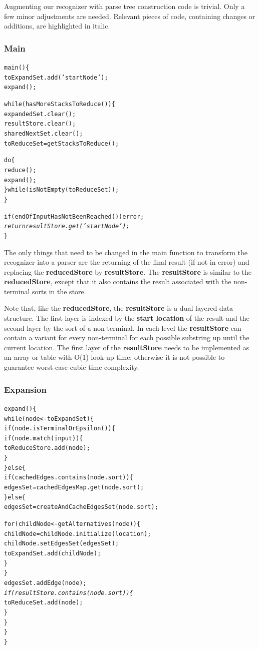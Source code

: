\documentclass[a4paper,10pt]{article}
\begin{document}
Augmenting our recognizer with parse tree construction code is trivial. Only a few minor adjustments are needed. Relevant pieces of code, containing changes or additions, are highlighted in italic.

\subsubsection{Main}
{\small
\begin{alltt}
main()\{
  toExpandSet.add('startNode');
  expand();
  
  while(hasMoreStacksToReduce())\{
    expandedSet.clear();
    resultStore.clear();
    sharedNextSet.clear();
    toReduceSet = getStacksToReduce();
    
    do\{
       reduce();
       expand();
    \}while(isNotEmpty(toReduceSet));
  \}
  
  if(endOfInputHasNotBeenReached()) error;
  \textit{
  return resultStore.get('startNode');}
\}
\end{alltt}
}

The only things that need to be changed in the main function to transform the recognizer into a parser are the returning of the final result (if not in error) and replacing the {\bf reducedStore} by {\bf resultStore}. The {\bf resultStore} is similar to the {\bf reducedStore}, except that it also contains the result associated with the non-terminal sorts in the store.

Note that, like the {\bf reducedStore}, the {\bf resultStore} is a dual layered data structure. The first layer is indexed by the {\bf start location} of the result and the second layer by the sort of a non-terminal. In each level the {\bf resultStore} can contain a variant for every non-terminal for each possible substring up until the current location. The first layer of the {\bf resultStore} needs to be implemented as an array or table with O(1) look-up time; otherwise it is not possible to guarantee worst-case cubic time complexity.

\pagebreak
\subsubsection{Expansion}
{\small
\begin{alltt}
expand()\{
  while(node <- toExpandSet)\{
    if(node.isTerminalOrEpsilon())\{
      if(node.match(input))\{
        toReduceStore.add(node);
      \}
    \}else\{
      if(cachedEdges.contains(node.sort))\{
        edgesSet = cachedEdgesMap.get(node.sort);
      \}else\{
        edgesSet = createAndCacheEdgesSet(node.sort);
        
        for(childNode <- getAlternatives(node))\{
          childNode = childNode.initialize(location);
          childNode.setEdgesSet(edgesSet);
          toExpandSet.add(childNode);
        \}
      \}
      edgesSet.addEdge(node);
      \textit{
      if(resultStore.contains(node.sort))\{}
        toReduceSet.add(node);
      \}
    \}
  \}
\}
\end{alltt}
}
\end{document}
